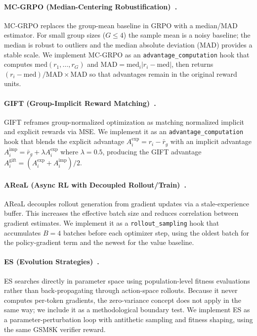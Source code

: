 \paragraph{MC-GRPO (Median-Centering Robustification)~\cite{mcgrpo2025}.}
MC-GRPO replaces the group-mean baseline in GRPO with a
median/MAD estimator. For small group sizes ($G \le 4$) the sample
mean is a noisy baseline; the median is robust to outliers and the
median absolute deviation (MAD) provides a stable scale. We
implement MC-GRPO as an \texttt{advantage\_computation} hook that
computes $\mathrm{med}(r_1,\dots,r_G)$ and
$\mathrm{MAD} = \mathrm{med}_i|r_i - \mathrm{med}|$, then returns
$(r_i - \mathrm{med}) / \mathrm{MAD} \times \mathrm{MAD}$ so that
advantages remain in the original reward units.

\paragraph{GIFT (Group-Implicit Reward Matching)~\cite{gift2025}.}
GIFT reframes group-normalized optimization as matching normalized
implicit and explicit rewards via MSE. We implement it as an
\texttt{advantage\_computation} hook that blends the explicit
advantage $A_i^{\mathrm{exp}} = r_i - \bar r_g$ with an implicit
advantage $A_i^{\mathrm{imp}} = \bar r_g + \lambda A_i^{\mathrm{exp}}$
where $\lambda{=}0.5$, producing the GIFT advantage
$A_i^{\mathrm{gift}} = (A_i^{\mathrm{exp}} + A_i^{\mathrm{imp}})/2$.

\paragraph{AReaL (Async RL with Decoupled Rollout/Train)~\cite{areal2025}.}
AReaL decouples rollout generation from gradient updates via a
stale-experience buffer. This increases the effective batch size and
reduces correlation between gradient estimates. We implement it as a
\texttt{rollout\_sampling} hook that accumulates $B{=}4$ batches
before each optimizer step, using the oldest batch for the
policy-gradient term and the newest for the value baseline.

\paragraph{ES (Evolution Strategies)~\cite{es2025}.}
ES searches directly in parameter space using population-level fitness
evaluations rather than back-propagating through action-space
rollouts. Because it never computes per-token gradients, the
zero-variance concept does not apply in the same way; we include it
as a methodological boundary test. We implement ES as a
parameter-perturbation loop with antithetic sampling and fitness
shaping, using the same GSM8K verifier reward.  

